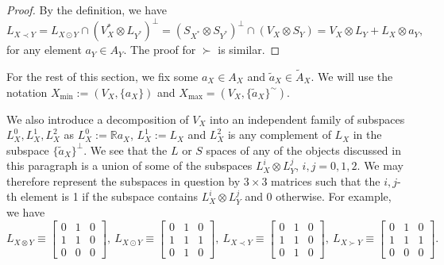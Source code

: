 \documentclass[12pt]{article}
\theoremstyle{definition}
\theoremstyle{remark}
\begin{document}
\begin{proof} By the definition, we have
\[
L_{X\prec Y}= L_{X\odot Y}\cap (V_X^*\otimes L_{Y^*})^\perp=(S_{X^*}\otimes
S_{Y^*})^\perp\cap (V_X\otimes S_Y)=V_X\otimes L_Y+L_X\otimes a_Y,
\]
for any element $a_Y\in A_Y$.
The proof for $\succ$ is similar.

\end{proof}




For the rest of this section, we fix some  $a_X\in A_X$ and $\tilde a_X\in \tilde A_X$. We will use the notation
$X_{\min}:=(V_X,\{a_X\})$ and 
$X_{\max}=(V_X, \{\tilde a_X\}^\sim)$. 

%
We also introduce a decomposition of $V_X$ into an independent family of subspaces
$L_X^0,L^1_X,L^2_X$ as
$L_X^0:=\mathbb Ra_X$, $L_X^1:=L_X$ and $L_X^2$ is any complement of $L_X$ in the subspace
$\{\tilde a_X\}^\perp$. We see that the $L$ or $S$ spaces of any of the objects discussed
in this paragraph is a union of some of the subspaces $L_X^i\otimes L_Y^j$, $i,j=0,1,2$. 
We may therefore represent the subspaces in question by $3\times 3$ matrices such that 
the $i,j$-th element is 1 if the subspace contains $L_X^i\otimes L_Y^j$ and 0 otherwise.
For example, we have
\begin{equation}\label{eq:matrices}
L_{X\otimes Y}\equiv \begin{bmatrix} 0& 1&0\\ 1 &1 &0\\ 0 & 0&0\end{bmatrix}, \ 
L_{X\odot Y}\equiv \begin{bmatrix} 0& 1&0\\ 1 &1 &1\\ 0 & 1&0\end{bmatrix},\ 
L_{X\prec Y}\equiv \begin{bmatrix} 0& 1&0\\ 1 &1 &0\\ 0 & 1 &0\end{bmatrix}, \ 
L_{X\succ Y}\equiv \begin{bmatrix} 0& 1&0\\ 1 &1 &1\\ 0 & 0&0\end{bmatrix}.
\end{equation}
\end{document}

